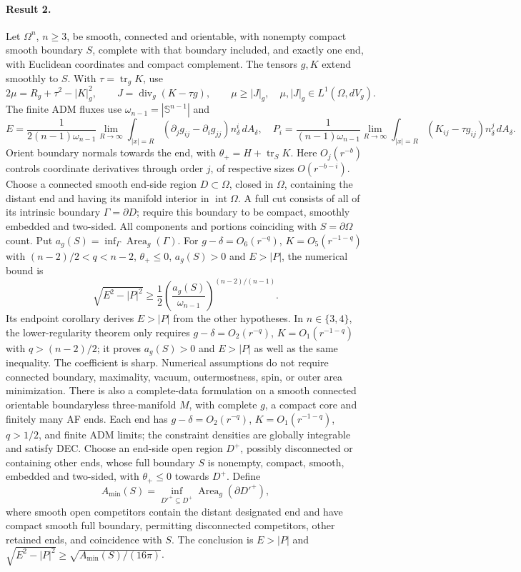 \documentclass[11pt]{article}
\begin{document}
\paragraph{Result 2.} Let $\Omega^n$, $n\ge3$, be smooth, connected and orientable, with nonempty compact smooth boundary $S$, complete with that boundary included, and exactly one end, with Euclidean coordinates and compact complement. The tensors $g,K$ extend smoothly to $S$. With $\tau=\operatorname{tr}_gK$, use
\[
 2\mu=R_g+\tau^2-|K|_g^2,\qquad J=\operatorname{div}_g(K-\tau g),\qquad
 \mu\ge|J|_g,\quad\mu,|J|_g\in L^1(\Omega,dV_g).
\]
The finite ADM fluxes use $\omega_{n-1}=|\mathbb S^{n-1}|$ and
\[
 E=\frac1{2(n-1)\omega_{n-1}}\lim_{R\to\infty}\int_{|x|=R}
 (\partial_jg_{ij}-\partial_ig_{jj})n_\delta^i\,dA_\delta,\quad
 P_i=\frac1{(n-1)\omega_{n-1}}\lim_{R\to\infty}\int_{|x|=R}(K_{ij}-\tau g_{ij})n_\delta^j\,dA_\delta.
\]
Orient boundary normals towards the end, with $\theta_+=H+\operatorname{tr}_SK$. Here $O_j(r^{-b})$ controls coordinate derivatives through order $j$, of respective sizes $O(r^{-b-i})$. Choose a connected smooth end-side region $D\subset\Omega$, closed in $\Omega$, containing the distant end and having its manifold interior in $\operatorname{int}\Omega$. A full cut consists of all of its intrinsic boundary $\Gamma=\partial D$; require this boundary to be compact, smoothly embedded and two-sided. All components and portions coinciding with $S=\partial\Omega$ count. Put $a_g(S)=\inf_\Gamma\operatorname{Area}_g(\Gamma)$. For $g-\delta=O_6(r^{-q})$, $K=O_5(r^{-1-q})$ with $(n-2)/2<q<n-2$, $\theta_+\le0$, $a_g(S)>0$ and $E>|P|$, the numerical bound is
\[
 \sqrt{E^2-|P|^2}\ge\frac12\left(\frac{a_g(S)}{\omega_{n-1}}\right)^{(n-2)/(n-1)}.
\]
Its endpoint corollary derives $E>|P|$ from the other hypotheses. In $n\in\{3,4\}$, the lower-regularity theorem only requires $g-\delta=O_2(r^{-q})$, $K=O_1(r^{-1-q})$ with $q>(n-2)/2$; it proves $a_g(S)>0$ and $E>|P|$ as well as the same inequality. The coefficient is sharp. Numerical assumptions do not require connected boundary, maximality, vacuum, outermostness, spin, or outer area minimization. There is also a complete-data formulation on a smooth connected orientable boundaryless three-manifold $M$, with complete $g$, a compact core and finitely many AF ends. Each end has $g-\delta=O_2(r^{-q})$, $K=O_1(r^{-1-q})$, $q>1/2$, and finite ADM limits; the constraint densities are globally integrable and satisfy DEC. Choose an end-side open region $D^+$, possibly disconnected or containing other ends, whose full boundary $S$ is nonempty, compact, smooth, embedded and two-sided, with $\theta_+\le0$ towards $D^+$. Define
\[
 A_{\min}(S)=\inf_{D'^+\subseteq D^+}\operatorname{Area}_g(\partial D'^+),
\]
where smooth open competitors contain the distant designated end and have compact smooth full boundary, permitting disconnected competitors, other retained ends, and coincidence with $S$. The conclusion is $E>|P|$ and $\sqrt{E^2-|P|^2}\ge\sqrt{A_{\min}(S)/(16\pi)}$.
\end{document}
